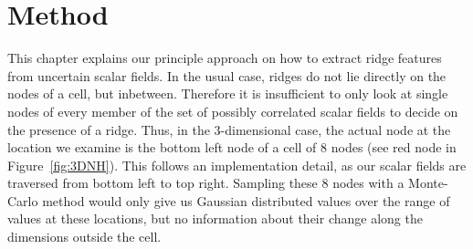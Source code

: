 \chapter{Method}\label{chap:Method}

This chapter explains our principle approach on how to extract ridge
features from uncertain scalar fields. In the usual case, ridges do not
lie directly on the nodes of a cell, but inbetween. Therefore it is
insufficient to only look at single nodes of every member of the set of
possibly correlated scalar fields to decide on the presence of a ridge.
Thus, in the $3$-dimensional case, the actual node at the location we
examine is the bottom left node of a cell of 8 nodes (see red node in
Figure~\ref{fig:3DNH}). This follows an implementation detail, as our
scalar fields are traversed from bottom left to top right. Sampling
these 8 nodes with a Monte-Carlo method would only give us Gaussian
distributed values over the range of values at these locations, but no
information about their change along the dimensions outside the cell.\\

